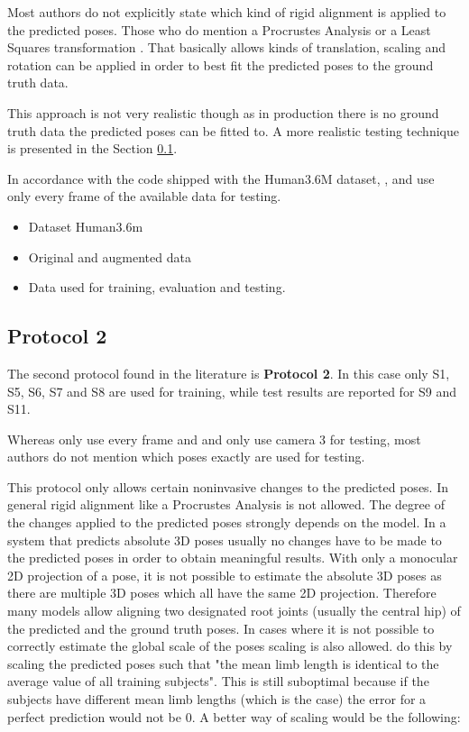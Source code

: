 Most authors do not explicitly state which kind of rigid alignment is applied to the predicted poses.
Those who do mention a Procrustes Analysis \cite{sun17, tome17} or a Least Squares transformation \cite{kostrikov14}.
That basically allows kinds of translation, scaling and rotation can be applied in order to best fit the predicted poses to the ground truth data.

This approach is not very realistic though as in production there is no ground truth data the predicted poses can be fitted to.
A more realistic testing technique is presented in the Section \ref{sec:protocol2}.

In accordance with the code shipped with the Human3.6M dataset, \citet{sun17}, \citet{chen17} and \citet{moreno-noguer16} use only every  frame of the available data for testing.



%
\begin{itemize}
	\item Dataset Human3.6m
	\item Original and augmented data
	\item Data used for training, evaluation and testing.
\end{itemize}
\subsection{Protocol 2}\label{sec:protocol2}

The second protocol found in the literature is \textbf{Protocol 2}.
In this case only S1, S5, S6, S7 and S8 are used for training, while test results are reported for S9 and S11.

Whereas \citet{sun17} only use every  frame and \citet{moreno-noguer16} and \citet{bogo16} only use camera 3 for testing, most authors do not mention which poses exactly are used for testing.

This protocol only allows certain noninvasive changes to the predicted poses.
In general rigid alignment like a Procrustes Analysis is not allowed.
The degree of the changes applied to the predicted poses strongly depends on the model.
In a system that predicts absolute 3D poses usually no changes have to be made to the predicted poses in order to obtain meaningful results.
With only a monocular 2D projection of a pose, it is not possible to estimate the absolute 3D poses as there are multiple 3D poses which all have the same 2D projection.
Therefore many models \cite{martinez17, zhou18, zhou16, tekin16, pavlakos17} allow aligning two designated root joints (usually the central hip) of the predicted and the ground truth poses.
In cases where it is not possible to correctly estimate the global scale of the poses scaling is also allowed.
\citet{zhou18} do this by scaling the predicted poses such that "the mean limb length is identical to the average value of all training subjects".
This is still suboptimal because if the subjects have different mean limb lengths (which is the case) the error for a perfect prediction would not be 0.
A better way of scaling would be the following:

